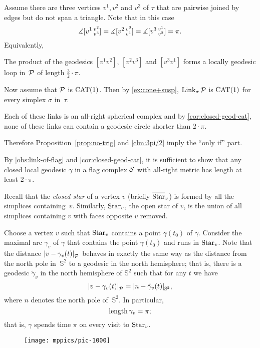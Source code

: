 Assume there are three vertices $v^1,v^2$ and $v^3$ of $\tau$
that are pairwise joined by edges 
but do not span a triangle.
Note that in this case 
\[
\measuredangle[v^1\,{}^{v^2}_{v^3}]=
\measuredangle[v^2\,{}^{v^3}_{v^1}]=
\measuredangle[v^3\,{}^{v^1}_{v^2}]=
\pi.
\]
Equivalently,
\begin{clm}{}\label{clm:3pi/2}
The product
of the geodesics $[v^1v^2]$, $[v^2v^3]$ and $[v^3v^1]$
forms a locally geodesic loop in~$\mathcal{P}$ of length $\tfrac32\cdot\pi$.
\end{clm}

Now assume that $\mathcal{P}$ is $\mathrm{CAT}(1)$.
Then by \ref{ex:cone+susp},
$\mathop{\rm Link}\nolimits_\sigma\mathcal{P}$ is $\mathrm{CAT}(1)$ for every simplex $\sigma$ 
in~$\tau$. 

Each of these links is an all-right spherical complex and by \ref{cor:closed-geod-cat}, none of these links can contain a geodesic circle shorter than $2\cdot\pi$. 

Therefore Proposition~\ref{prop:no-trig} and \ref{clm:3pi/2} 
imply the ``only if'' part.

By \ref{obs:link-of-flag} and \ref{cor:closed-geod-cat},
it is sufficient to show that any closed local geodesic $\gamma$ 
in a flag complex $\mathcal{S}$ with all-right metric has length at least $2\cdot\pi$.

Recall that the  \emph{closed star} of a vertex $v$ (briefly $\overline {\mathop{\rm Star}\nolimits}_v$)
is formed by all the simplices containing~$v$. 
Similarly, $\mathop{\rm Star}\nolimits_v$, the open star of $v$, is the union of all simplices containing $v$ with faces opposite $v$ removed.

Choose a vertex $v$ such that $\mathop{\rm Star}\nolimits_v$ contains a point $\gamma(t_0)$ of $\gamma$.
Consider the maximal arc $\gamma_v$ of $\gamma$ 
that contains the point $\gamma(t_0)$
and runs in $\mathop{\rm Star}\nolimits_v$.
Note that the distance $\dist{v}{\gamma_v(t)}{\spc{P}}$ behaves in exactly the same way 
as the distance from the north pole in~$\mathbb{S}^2$ to a geodesic in the north hemisphere;
that is, there is a geodesic $\tilde\gamma_v$ in the north hemisphere of $\mathbb{S}^2$ such that for any $t$ we have
\[\dist{v}{\gamma_v(t)}{\spc{P}}
=
\dist{n}{\tilde\gamma_v(t)}{\mathbb{S}^2},\]
where $n$ denotes the north pole of~$\mathbb{S}^2$.
In particular, 
\[\mathop{\rm length}\nolimits\gamma_v=\pi;\]
that is, $\gamma$ spends time $\pi$ on every visit to $\mathop{\rm Star}\nolimits_v$.


\begin{wrapfigure}{r}{45mm}
\vskip-2mm
\centering
\texttt{[image: mppics/pic-1000]}
\end{wrapfigure}

